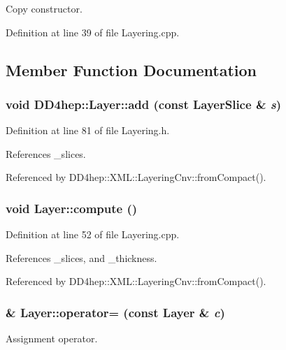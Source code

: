 Copy constructor. 

Definition at line 39 of file Layering.cpp.

\subsection{Member Function Documentation}
\hypertarget{class_d_d4hep_1_1_layer_a0e2f64de27f1eae32c830a83df7793ed}{
\subsubsection[{add}]{\setlength{\rightskip}{0pt plus 5cm}void DD4hep::Layer::add (const {\bf LayerSlice} \& {\em s})}}
\label{class_d_d4hep_1_1_layer_a0e2f64de27f1eae32c830a83df7793ed}


Definition at line 81 of file Layering.h.

References \_\-slices.

Referenced by DD4hep::XML::LayeringCnv::fromCompact().\hypertarget{class_d_d4hep_1_1_layer_a7353fc97976976a6d739e37af18954de}{
\subsubsection[{compute}]{\setlength{\rightskip}{0pt plus 5cm}void Layer::compute ()}}
\label{class_d_d4hep_1_1_layer_a7353fc97976976a6d739e37af18954de}


Definition at line 52 of file Layering.cpp.

References \_\-slices, and \_\-thickness.

Referenced by DD4hep::XML::LayeringCnv::fromCompact().\hypertarget{class_d_d4hep_1_1_layer_adc08802cc74ff34cb73d593b79181394}{
\subsubsection[{operator=}]{ \& Layer::operator= (const {\bf Layer} \& {\em c})}}
\label{class_d_d4hep_1_1_layer_adc08802cc74ff34cb73d593b79181394}


Assignment operator. 

